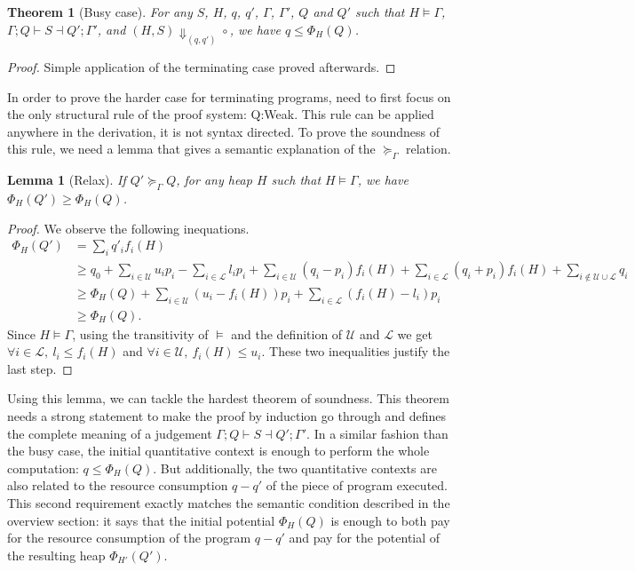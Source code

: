 \documentclass[10pt]{article}
\newtheorem{lemma}{Lemma}
\newtheorem{theorem}{Theorem}
\begin{document}
\begin{theorem}[Busy case]
For any $S$, $H$, $q$, $q'$, $\Gamma$, $\Gamma'$, $Q$ and $Q'$
such that $H \models \Gamma$, $\Gamma; Q \vdash S \dashv Q'; \Gamma'$,
  and $(H, S) \Downarrow_{(q,q')} \circ$,
we have $q \le \Phi_H(Q)$.
\end{theorem}
\begin{proof}
Simple application of the terminating case proved afterwards.
\end{proof}

In order to prove the harder case for terminating programs, need to first
focus on the only structural rule of the proof system: {\sc Q:Weak}.  This
rule can be applied anywhere in the derivation, it is not syntax directed.
To prove the soundness of this rule, we need a lemma that gives a
semantic explanation of the $\succeq_\Gamma$ relation.

\begin{lemma}[Relax]
If $Q' \succeq_\Gamma Q$, for any heap $H$ such that $H \models \Gamma$,
we have $\Phi_H(Q') \ge \Phi_H(Q)$.
\end{lemma}
\begin{proof}
We observe the following inequations.
\begin{align*}
\Phi_H(Q') &= \sum_i q'_i f_i(H) \\
&\ge q_0 + \sum_{i\in\mathcal U} u_i p_i - \sum_{i\in\mathcal L} l_i p_i
  + \sum_{i\in\mathcal U} (q_i - p_i) f_i(H) + \sum_{i\in\mathcal L} (q_i + p_i) f_i(H)
  + \sum_{i\not\in \mathcal U \cup \mathcal L} q_i \\
 &\ge \Phi_H(Q)
  + \sum_{i\in\mathcal U} (u_i - f_i(H)) p_i
  + \sum_{i\in\mathcal L} (f_i(H) - l_i) p_i \\
 &\ge \Phi_H(Q).
\end{align*}
Since $H \models \Gamma$, using the transitivity of $\models$ and
the definition of $\mathcal U$ and $\mathcal L$ we get
$\forall i\in\mathcal L,~ l_i \le f_i(H)$ and
$\forall i\in\mathcal U,~ f_i(H)\le u_i$.
These two inequalities justify the last step.
\end{proof}

Using this lemma, we can tackle the hardest theorem of soundness.  This theorem
needs a strong statement to make the proof by induction go through and defines
the complete meaning of a judgement $\Gamma; Q \vdash S \dashv Q'; \Gamma'$.
In a similar fashion than the busy case, the initial quantitative context is enough
to perform the whole computation: $q \le \Phi_H(Q)$.  But additionally, the
two quantitative contexts are also related to the resource consumption $q - q'$
of the piece of program executed.  This second requirement exactly matches
the semantic condition described in the overview section: it says that the
initial potential $\Phi_H(Q)$ is enough to both pay for the resource
consumption of the program $q - q'$ and pay for the potential of the resulting
heap $\Phi_{H'}(Q')$.
\end{document}
